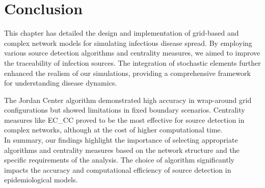 \section{Conclusion}

This chapter has detailed the design and implementation of grid-based and complex network models for simulating infectious disease spread. By employing various source detection algorithms and centrality measures, we aimed to improve the traceability of infection sources. The integration of stochastic elements further enhanced the realism of our simulations, providing a comprehensive framework for understanding disease dynamics.

The Jordan Center algorithm demonstrated high accuracy in wrap-around grid configurations but showed limitations in fixed boundary scenarios. Centrality measures like EC\_CC proved to be the most effective for source detection in complex networks, although at the cost of higher computational time.\\

In summary, our findings highlight the importance of selecting appropriate algorithms and centrality measures based on the network structure and the specific requirements of the analysis. The choice of algorithm significantly impacts the accuracy and computational efficiency of source detection in epidemiological models.
